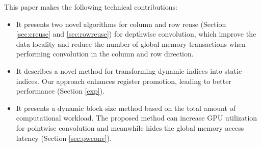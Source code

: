 This paper makes the following technical contributions:
\begin{itemize}
    \item It presents two novel algorithms for column and row reuse (Section \ref{sec:creuse} and \ref{sec:rowreuse}) for depthwise convolution, which improve the data locality and reduce the number of global memory transactions when performing convolution in the column and row direction.
    \item It describes a novel method for transforming dynamic indices into static indices.
    Our approach enhances register promotion, leading to better performance (Section \ref{exp}).
    \item It presents a dynamic block size method based on the total amount of computational workload. The proposed method can increase GPU utilization for pointwise convolution and meanwhile hides the global memory access latency (Section \ref{sec:pwconv}).
\end{itemize}
